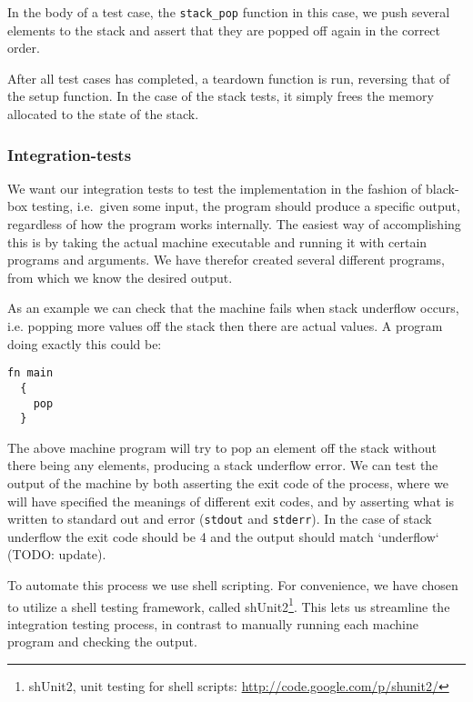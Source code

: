 In the body of a test case, the {\tt stack\_pop} function in this case, we push
several elements to the stack and assert that they are popped off again in the
correct order.

After all test cases has completed, a teardown function is run, reversing that
of the setup function. In the case of the stack tests, it simply frees the
memory allocated to the state of the stack.

\subsubsection{Integration-tests}

We want our integration tests to test the implementation in the fashion of
black-box testing, i.e.~given some input, the program should produce a specific
output, regardless of how the program works internally. The easiest way of
accomplishing this is by taking the actual machine executable and running it
with certain programs and arguments. We have therefor created several different
programs, from which we know the desired output.

As an example we can check that the machine fails when stack underflow occurs,
i.e. popping more values off the stack then there are actual values. A program
doing exactly this could be:
\begin{lstlisting}[language={bytecode},caption={Machine program producing
    stack underflow}]
  fn main
  {
    pop
  }
\end{lstlisting}

The above machine program will try to pop an element off the stack without there
being any elements, producing a stack underflow error. We can test the output of
the machine by both asserting the exit code of the process, where we will have
specified the meanings of different exit codes, and by asserting what is written
to standard out and error ({\tt stdout} and {\tt stderr}). In the case of stack
underflow the exit code should be 4 and the output should match `underflow`
(TODO: update).

To automate this process we use shell scripting. For convenience, we have chosen
to utilize a shell testing framework, called shUnit2\footnote{shUnit2, unit
  testing for shell scripts: \url{http://code.google.com/p/shunit2/}}. This lets
us streamline the integration testing process, in contrast to manually running
each machine program and checking the output.

